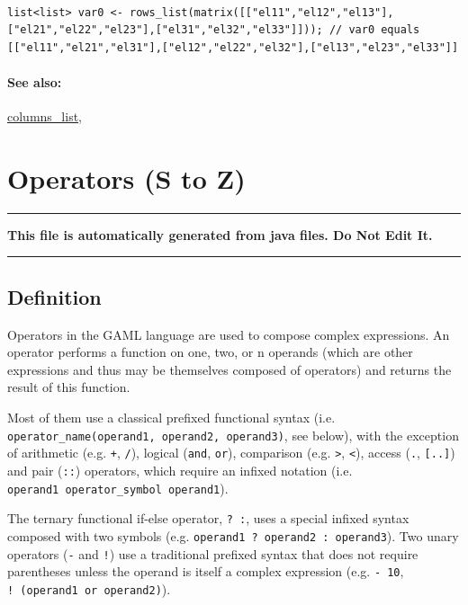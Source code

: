 \documentclass[]{book}
\theoremstyle{definition}
\theoremstyle{definition}
\theoremstyle{definition}
\theoremstyle{remark}
\begin{document}
\begin{verbatim}
 
list<list> var0 <- rows_list(matrix([["el11","el12","el13"],["el21","el22","el23"],["el31","el32","el33"]])); // var0 equals [["el11","el21","el31"],["el12","el22","el32"],["el13","el23","el33"]]
\end{verbatim}

\subsubsection{See also:}\label{see-also-182}

\href{operators-b-to-c.html\#columns_list}{columns\_list},

\chapter{Operators (S to Z)}\label{operators-s-to-z}

\begin{center}\rule{0.5\linewidth}{\linethickness}\end{center}

\textbf{This file is automatically generated from java files. Do Not
Edit It.}

\begin{center}\rule{0.5\linewidth}{\linethickness}\end{center}

\section{Definition}\label{definition-5}

Operators in the GAML language are used to compose complex expressions.
An operator performs a function on one, two, or n operands (which are
other expressions and thus may be themselves composed of operators) and
returns the result of this function.

Most of them use a classical prefixed functional syntax (i.e.
\texttt{operator\_name(operand1,\ operand2,\ operand3)}, see below),
with the exception of arithmetic (e.g. \texttt{+}, \texttt{/}), logical
(\texttt{and}, \texttt{or}), comparison (e.g. \texttt{\textgreater{}},
\texttt{\textless{}}), access (\texttt{.}, \texttt{{[}..{]}}) and pair
(\texttt{::}) operators, which require an infixed notation (i.e.
\texttt{operand1\ operator\_symbol\ operand1}).

The ternary functional if-else operator, \texttt{?\ :}, uses a special
infixed syntax composed with two symbols (e.g.
\texttt{operand1\ ?\ operand2\ :\ operand3}). Two unary operators
(\texttt{-} and \texttt{!}) use a traditional prefixed syntax that does
not require parentheses unless the operand is itself a complex
expression (e.g. \texttt{-\ 10}, \texttt{!\ (operand1\ or\ operand2)}).
\end{document}
